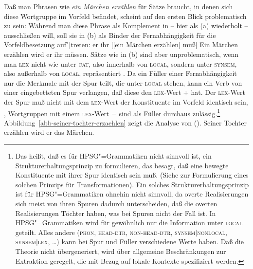 Daß man Phrasen wie \emph{ein Märchen erzählen} für Sätze braucht, in denen sich diese Wortgruppe im Vorfeld
befindet, scheint auf den ersten Blick problematisch zu sein: Während man diese Phrase als Komplement
in  -- hier als (a) wiederholt -- ausschließen will,
soll sie in (b) als Binder der Fernabhängigkeit
für die Vorfeldbesetzung auf"|treten:
\eal
\ex er ihr [[ein Märchen erzählen] muß]
\ex Ein Märchen erzählen wird er ihr müssen.
\zl
Sätze wie in (b) sind aber unproblematisch, wenn man \textsc{lex} nicht wie \cite[]{ps2}
unter \textsc{cat}, also innerhalb von \textsc{local}, sondern unter \textsc{synsem}, also außerhalb von
\textsc{local}, repräsentiert \citep{Mueller96a,Mueller99a,Mueller2002b,Meurers99a}.
Da ein Füller einer Fernabhängigkeit nur die Merkmale mit der Spur teilt, die unter \textsc{local} stehen,
kann ein Verb von einer eingebetteten Spur verlangen, daß diese den \textsc{lex}-Wert + hat. Der \textsc{lex}-Wert
der Spur muß nicht mit dem \textsc{lex}-Wert der Konstituente im Vorfeld identisch sein,
\dash, Wortgruppen mit einem \textsc{lex}-Wert $-$ sind als Füller durchaus
zulässig.\footnote{
        Das heißt, daß es für HPSG"=Grammatiken nicht sinnvoll ist, ein Strukturerhaltungsprinzip
        zu formulieren,
        das besagt, daß eine bewegte Konstituente mit ihrer Spur identisch sein muß. (Siehe \zb
         zur Formulierung eines solchen Prinzips für Transformationen). Ein solches Strukturerhaltungsprinzip
        ist für HPSG"=Grammatiken ohnehin nicht sinnvoll, da overte Realisierungen sich meist von
        ihren Spuren dadurch unterscheiden, daß die overten Realisierungen Töchter haben, was bei Spuren
        nicht der Fall ist. In HPSG"=Grammatiken wird für gewöhnlich nur die Information unter \textsc{local}
        geteilt. Alles andere (\textsc{phon}, \textsc{head-dtr}, \textsc{non-head-dtr}, \textsc{synsem$|$nonlocal},
        \textsc{synsem$|$lex}, \ldots) kann bei Spur und Füller verschiedene Werte haben. Daß die Theorie nicht übergeneriert,
        wird über allgemeine Beschränkungen zur Extraktion geregelt, die mit Bezug auf lokale Kontexte
        spezifiziert werden.%
}
Abbildung~\vref{abb-seiner-tochter-erzaehlen} zeigt die Analyse von ().
\ea
Seiner Tochter erzählen wird er das Märchen.
\z
